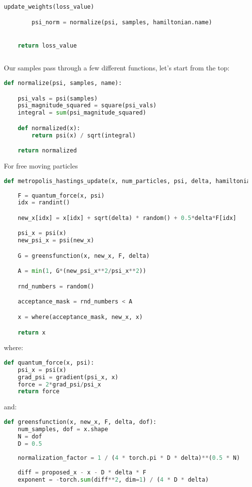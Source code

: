 \documentclass[12pt]{article}
\begin{document}
{\begin{lstlisting}[language=Python]
        update_weights(loss_value)

        psi_norm = normalize(psi, samples, hamiltonian.name)


    return loss_value
    
\end{lstlisting}
\newpage
Our samples pass through a few different functions, let's start from the top:
\begin{lstlisting}[language=Python]
def normalize(psi, samples, name):

    psi_vals = psi(samples)
    psi_magnitude_squared = square(psi_vals)
    integral = sum(psi_magnitude_squared)

    def normalized(x):
        return psi(x) / sqrt(integral)

    return normalized
\end{lstlisting}
For free moving particles
\begin{lstlisting}[language=Python]
def metropolis_hastings_update(x, num_particles, psi, delta, hamiltonian.name):
    
    F = quantum_force(x, psi)
    idx = randint()

    new_x[idx] = x[idx] + sqrt(delta) * random() + 0.5*delta*F[idx]

    psi_x = psi(x)
    new_psi_x = psi(new_x)

    G = greensfunction(x, new_x, F, delta)

    A = min(1, G*(new_psi_x**2/psi_x**2))

    rnd_numbers = random()

    acceptance_mask = rnd_numbers < A

    x = where(acceptance_mask, new_x, x)

    return x
\end{lstlisting}
where:
\begin{lstlisting}[language=Python]
def quantum_force(x, psi):
    psi_x = psi(x)
    grad_psi = gradient(psi_x, x)
    force = 2*grad_psi/psi_x
    return force
\end{lstlisting}
\newpage
and:
\begin{lstlisting}[language=Python]
def greensfunction(x, new_x, F, delta, dof):
    num_samples, dof = x.shape
    N = dof  
    D = 0.5
    
    normalization_factor = 1 / (4 * torch.pi * D * delta)**(0.5 * N)
    
    diff = proposed_x - x - D * delta * F
    exponent = -torch.sum(diff**2, dim=1) / (4 * D * delta)
    

\end{lstlisting}}
\end{document}
